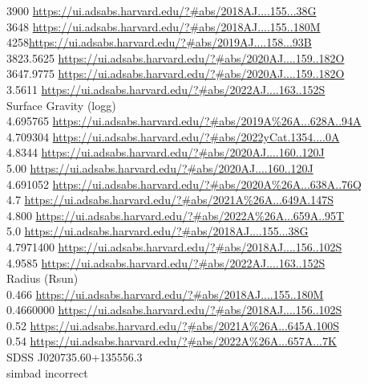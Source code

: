 3900 \url{https://ui.adsabs.harvard.edu/?#abs/2018AJ....155...38G}\\
3648 \url{https://ui.adsabs.harvard.edu/?#abs/2018AJ....155..180M}\\
4258\url{https://ui.adsabs.harvard.edu/?#abs/2019AJ....158...93B}\\
3823.5625 \url{https://ui.adsabs.harvard.edu/?#abs/2020AJ....159..182O}\\
3647.9775 \url{https://ui.adsabs.harvard.edu/?#abs/2020AJ....159..182O}\\
3.5611 \url{https://ui.adsabs.harvard.edu/?#abs/2022AJ....163..152S}\\
Surface Gravity (logg)\\
4.695765 \url{https://ui.adsabs.harvard.edu/?#abs/2019A%26A...628A..94A}\\
4.709304 \url{https://ui.adsabs.harvard.edu/?#abs/2022yCat.1354....0A}\\
4.8344 \url{https://ui.adsabs.harvard.edu/?#abs/2020AJ....160..120J}\\
5.00 \url{https://ui.adsabs.harvard.edu/?#abs/2020AJ....160..120J}\\
4.691052 \url{https://ui.adsabs.harvard.edu/?#abs/2020A%26A...638A..76Q}\\
4.7 \url{https://ui.adsabs.harvard.edu/?#abs/2021A%26A...649A.147S}\\
4.800 \url{https://ui.adsabs.harvard.edu/?#abs/2022A%26A...659A..95T}\\
5.0 \url{https://ui.adsabs.harvard.edu/?#abs/2018AJ....155...38G}\\
4.7971400 \url{https://ui.adsabs.harvard.edu/?#abs/2018AJ....156..102S}\\
4.9585 \url{https://ui.adsabs.harvard.edu/?#abs/2022AJ....163..152S}\\
Radius (Rsun)\\
0.466 \url{https://ui.adsabs.harvard.edu/?#abs/2018AJ....155..180M}\\
0.4660000 \url{https://ui.adsabs.harvard.edu/?#abs/2018AJ....156..102S}\\
0.52 \url{https://ui.adsabs.harvard.edu/?#abs/2021A%26A...645A.100S}\\
0.54 \url{https://ui.adsabs.harvard.edu/?#abs/2022A%26A...657A...7K}\\

SDSS J020735.60+135556.3\\
simbad incorrect\\